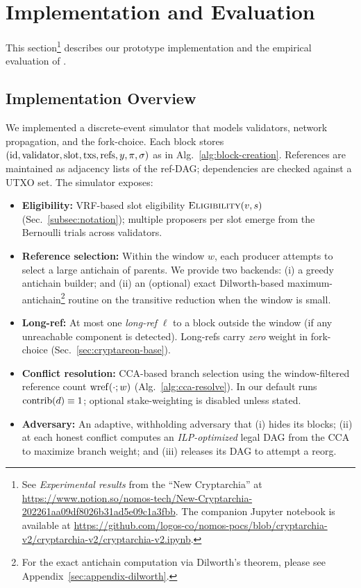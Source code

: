 
\section{Implementation and Evaluation}
\label{sec:impl-eval}

This section\footnote{See {\em Experimental results} from the ``New Cryptarchia'' at \url{https://www.notion.so/nomos-tech/New-Cryptarchia-202261aa09df8026b31ad5e09c1a3fbb}. The companion Jupyter notebook is available at \url{https://github.com/logos-co/nomos-pocs/blob/cryptarchia-v2/cryptarchia-v2/cryptarchia-v2.ipynb}.} describes our prototype implementation and the empirical evaluation of \ProjBase. 


\subsection{Implementation Overview}
We implemented a discrete-event simulator that models validators, network propagation, and the \ProjBase fork-choice. Each block stores $(\mathrm{id},\mathrm{validator},\mathrm{slot},\mathrm{txs},\mathrm{refs},y,\pi,\sigma)$ as in Alg.~\ref{alg:block-creation}. References are maintained as adjacency lists of the ref-DAG; dependencies are checked against a UTXO set. The simulator exposes:
\begin{itemize}
  \item \textbf{Eligibility:} VRF-based slot eligibility $\textsc{Eligibility}(v,s)$ (Sec.~\ref{subsec:notation}); multiple proposers per slot emerge from the Bernoulli trials across validators.
  \item \textbf{Reference selection:} Within the window $w$, each producer attempts to select a large antichain of parents. We provide two backends: (i) a greedy antichain builder; and (ii) an (optional) exact Dilworth-based maximum-antichain\footnote{For the exact antichain computation via Dilworth's theorem, please see Appendix~\ref{sec:appendix-dilworth}.} routine on the transitive reduction when the window is small.
  \item \textbf{Long-ref:} At most one \emph{long-ref} $\ell$ to a block outside the window (if any unreachable component is detected). Long-refs carry \emph{zero} weight in fork-choice (Sec.~\ref{sec:cryptareon-base}).
  \item \textbf{Conflict resolution:} CCA-based branch selection using the window-filtered reference count $\mathrm{wref}(\cdot;w)$ (Alg.~\ref{alg:cca-resolve}). In our default runs $\mathrm{contrib}(d)\equiv 1$; optional stake-weighting is disabled unless stated.
  \item \textbf{Adversary:} An adaptive, withholding adversary that (i) hides its blocks; (ii) at each honest conflict computes an \emph{ILP-optimized} legal DAG from the CCA to maximize branch weight; and (iii) releases its DAG to attempt a reorg.
\end{itemize}


